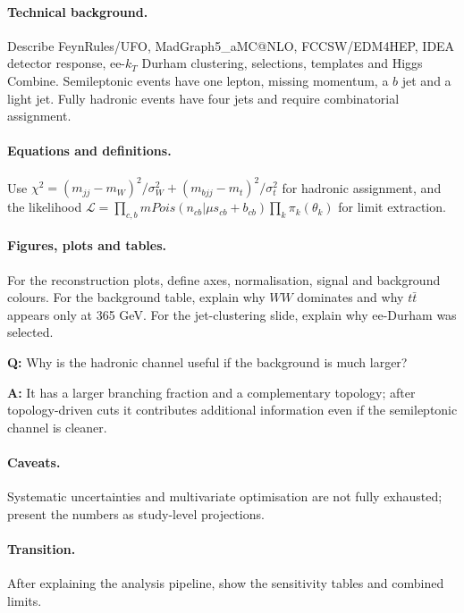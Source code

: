 \documentclass[11pt,a4paper]{report}
\newcommand{\ttbar}{t\bar t}
\begin{document}
\paragraph{Technical background.}
Describe FeynRules/UFO, MadGraph5\_aMC@NLO, FCCSW/EDM4HEP, IDEA detector response, ee-$k_T$ Durham clustering, selections, templates and Higgs Combine.  Semileptonic events have one lepton, missing momentum, a $b$ jet and a light jet.  Fully hadronic events have four jets and require combinatorial assignment.

\paragraph{Equations and definitions.}
Use $\chi^2=(m_{jj}-m_W)^2/\sigma_W^2+(m_{bjj}-m_t)^2/\sigma_t^2$ for hadronic assignment, and the likelihood $\mathcal L=\prod_{c,b}{
m Pois}(n_{cb}|\mu s_{cb}+b_{cb})\prod_k\pi_k(\theta_k)$ for limit extraction.

\paragraph{Figures, plots and tables.}
For the reconstruction plots, define axes, normalisation, signal and background colours.  For the background table, explain why $WW$ dominates and why $\ttbar$ appears only at 365 GeV.  For the jet-clustering slide, explain why ee-Durham was selected.

\begin{questionbox}
\textbf{Q:} Why is the hadronic channel useful if the background is much larger?\par
\textbf{A:} It has a larger branching fraction and a complementary topology; after topology-driven cuts it contributes additional information even if the semileptonic channel is cleaner.
\end{questionbox}

\paragraph{Caveats.}
Systematic uncertainties and multivariate optimisation are not fully exhausted; present the numbers as study-level projections.

\paragraph{Transition.}
After explaining the analysis pipeline, show the sensitivity tables and combined limits.
\end{document}
